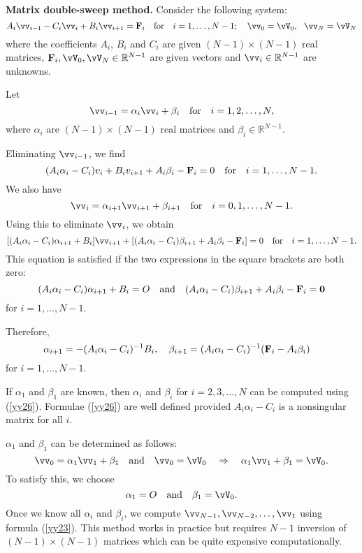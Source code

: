 \textbf{Matrix double-sweep method.}
Consider the following system:
\begin{equation}
A_{i}\vv_{i-1}-C_{i}\vv_{i}+B_{i}\vv_{i+1}={\bf F}_{i} \quad \hbox{for}\quad i=1, \dots, N-1;
\quad \vv_{0}={\vV_{0}}, \ \ \vv_{N}={\vV_{N}} \label{yy22}
\end{equation}
where the coefficients $A_{i}$, $B_{i}$ and $C_{i}$ are given $(N-1)\times(N-1)$ real matrices,
${\bf F}_{i}, {\vV_{0}}, {\vV_{N}}\in\mathbb{R}^{N-1}$ are given vectors and $\vv_{i}\in\mathbb{R}^{N-1}$ are unknowns.

Let
\begin{equation}
\vv_{i-1}=\alpha_{i}\vv_{i}+\beta_{i}  \quad  \hbox{for} \quad
i=1, 2, \dots, N, \label{yy23}
\end{equation}
where $\alpha_{i}$ are $(N-1)\times(N-1)$ real matrices
and $\beta_{i}\in\mathbb{R}^{N-1}$.

Eliminating $\vv_{i-1}$, we find
\[
(A_{i}\alpha_{i}-C_{i})v_{i}+B_{i}v_{i+1}+A_{i}\beta_{i} - {\bf F}_{i}=0 \quad \hbox{for}\quad i=1, \dots, N-1.
\]
We also have
\[
\vv_{i}=\alpha_{i+1}\vv_{i+1}+\beta_{i+1}  \quad  \hbox{for} \quad
i=0, 1, \dots, N-1.
\]
Using this to eliminate $\vv_{i}$, we obtain
\[
[(A_{i}\alpha_{i}-C_{i})\alpha_{i+1}+B_{i}]\vv_{i+1}+[
(A_{i}\alpha_{i}-C_{i})\beta_{i+1}+A_{i}\beta_{i}-{\bf F}_{i}]=0 \quad \hbox{for}\quad i=1, \dots, N-1.
\]
This equation is satisfied if the two expressions in the square brackets are both zero:
\[
(A_{i}\alpha_{i}-C_{i})\alpha_{i+1}+B_{i}=O \quad \textrm{and} \quad
(A_{i}\alpha_{i}-C_{i})\beta_{i+1}+A_{i}\beta_{i}-{\bf F}_{i}=\mathbf{0}
\]
for $i=1, \dots, N-1$.

Therefore,
\begin{equation}
\alpha_{i+1}=-(A_{i}\alpha_{i}-C_{i})^{-1}B_{i}, \quad
\beta_{i+1}=(A_{i}\alpha_{i}-C_{i})^{-1}({\bf F}_{i}-A_{i}\beta_{i}) \quad
 \label{yy26}
\end{equation}
for $i=1, \dots, N-1$.

If $\alpha_{1}$ and  $\beta_{1}$ are known, then $\alpha_{i}$ and  $\beta_{i}$ for $i=2, 3, \dots, N$
can be computed using (\ref{yy26}). Formulae (\ref{yy26}) are well defined provided
$A_{i}\alpha_{i}-C_{i}$
is a nonsingular matrix for all $i$.

$\alpha_{1}$ and  $\beta_{1}$ can be determined as follows:
\[
\vv_{0}= \alpha_{1}\vv_{1}+\beta_{1} \quad \hbox{and} \quad \vv_{0}=\vV_{0} \quad \Rightarrow \quad
\alpha_{1}\vv_{1}+\beta_{1}=\vV_{0}.
\]
To satisfy this, we choose
\[
\alpha_{1}=O \quad \textrm{and} \quad \beta_{1}=\vV_{0}.
\]
Once we know all $\alpha_{i}$
and $\beta_{i}$, we compute $\vv_{N-1}, \vv_{N-2}, \dots, \vv_{1}$ using formula (\ref{yy23}).
This method works in practice but requires $N-1$ inversion of $(N-1)\times(N-1)$ matrices which
can be quite expensive computationally.

